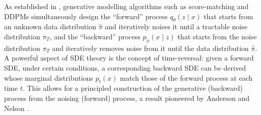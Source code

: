 As established in , generative modelling algorithms such as score-matching and DDPMs simultaneously design the ``forward'' process $q_{\theta}(z \mid x)$ that starts from an unknown data distribution $\hat{\pi}$ and iteratively noises it until a tractable noise distribution $\pi_T$, and the ``backward'' process $p_{\phi}(x \mid z)$ that starts from the noise distribution $\pi_T$ and iteratively removes noise from it until the data distribution $\hat{\pi}$. A powerful aspect of SDE theory is the concept of time-reversal: given a forward SDE, under certain conditions, a corresponding backward SDE can be derived whose marginal distributions $p_t(x)$ match those of the forward process at each time $t$. This allows for a principled construction of the generative (backward) process from the noising (forward) process, a result pioneered by Anderson \parencite{anderson1982reverse} and Nelson \parencite{nelson2020dynamical}.



